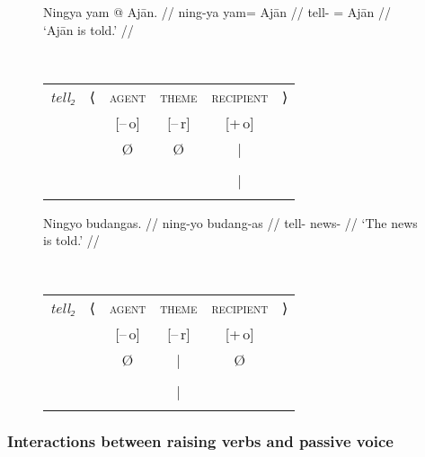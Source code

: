 \begin{figure}
\pex\label{ex:intrnzn_pass}
\a\label{ex:intrnzn_pass_1}%
\ljudge*\begin{minipage}[t]{.4\remaining}
\begingl
	\gla Ningya yam @ Ajān. //
	\glb ning-ya yam= Ajān //
	\glc tell-\TsgF{} \Dat{}= Ajān //
	\glft `Ajān is told.' //
\endgl
\end{minipage}
~
\begin{tabular}[t]{>{\itshape}l l c c c r}
tell₂
	& ⟨
	& \textsc{agent}
	& \textsc{theme}
	& \textsc{recipient}
	& ⟩
	\\
%
	& %
	& [–\,o]
	& [–\,r]
	& [+\,o]
	& %
	\\

%
	& %
	& Ø
	& Ø
	& |
	& %
	\\

%
	& %
	& %
	& %
	& \Subj
	& %
	\\

%
	& %
	& %
	& %
	& |
	& %
	\\

%
	& %
	& %
	& %
	& \fw{Ajān}
	& %
	\\
\end{tabular}

\a\label{ex:intrnzn_pass_2}%
\begin{minipage}[t]{.4\remaining}
\begingl
	\gla Ningyo budangas. //
	\glb ning-yo budang-as //
	\glc tell-\TsgN{} news-\Parg{} //
	\glft `The news is told.' //
\endgl
\end{minipage}
~
\begin{tabular}[t]{>{\itshape}l l c c c r}
tell₂
	& ⟨
	& \textsc{agent}
	& \textsc{theme}
	& \textsc{recipient}
	& ⟩
	\\
%
	& %
	& [–\,o]
	& [–\,r]
	& [+\,o]
	& %
	\\

%
	& %
	& Ø
	& |
	& Ø
	& %
	\\

%
	& %
	& %
	& \Subj
	& %
	& %
	\\

%
	& %
	& %
	& |
	& %
	& %
	\\

%
	& %
	& %
	& \fw{news}
	& %
	& %
	\\
\end{tabular}

\xe
\end{figure}

\subsubsection{Interactions between raising verbs and passive voice}

